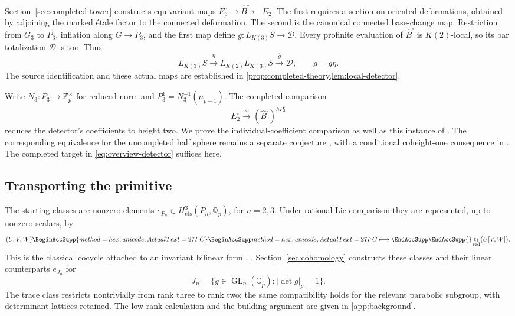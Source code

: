 \documentclass[11pt]{article}
\numberwithin{equation}{section}
\theoremstyle{definition}
\theoremstyle{remark}
\newcommand{\Q}{\mathbb Q}
\newcommand{\Z}{\mathbb Z}
\newcommand{\cts}{\mathrm{cts}}
\DeclareMathOperator{\GL}{GL}
\DeclareMathOperator{\tr}{tr}
\let\UnicodeOriginalLongmapsto\longmapsto
\DeclareRobustCommand{\longmapsto}{
  \BeginAccSupp{method=hex,unicode,ActualText=27FC}
  \UnicodeOriginalLongmapsto\EndAccSupp{}}
\begin{document}
Section~\ref{sec:completed-tower} constructs equivariant maps
\(E_3^\square\to\widehat B^\square\leftarrow E_2^\square\).
The first requires a section on oriented deformations, obtained by
adjoining the marked \'etale factor to the connected deformation.
The second is the canonical connected base-change map. Restriction
from \(G_3\) to \(P_3\), inflation along \(G\to P_3\), and the first
map define \(g:L_{K(3)}S\to\mathcal D\). Every profinite evaluation
of \(\widehat B^\square\) is \(K(2)\)-local, so its bar totalization
\(\mathcal D\) is too. Thus
\begin{equation}\label{eq:overview-detector}
 L_{K(3)}S\xrightarrow{\eta}L_{K(2)}L_{K(3)}S
       \xrightarrow{\overline g}\mathcal D,
 \qquad g=\overline g\eta.
\end{equation}
The source identification and these actual maps are established in
\cref{prop:completed-theory,lem:local-detector}.

Write \(N_3:P_3\to\Z_p^\times\) for reduced norm and
\(P_3^1=N_3^{-1}(\mu_{p-1})\). The completed comparison
\[
 E_2^\square\xrightarrow{\sim}(\widehat B^\square)^{hP_3^1}
\]
reduces the detector's coefficients to height two. We prove the
individual-coefficient comparison as well as this instance of
\cite[Theorem~5.2.6]{BMR2026}. The corresponding equivalence for the
uncompleted half sphere remains a separate conjecture
\cite[Conjectures~1.1.1 and~5.1.13]{BMR2026}, with a conditional
coheight-one consequence in \cite[Proposition~5.1.17]{BMR2026}.
The completed target in \eqref{eq:overview-detector} suffices here.

\subsection{Transporting the primitive}

The starting classes are nonzero elements
\(e_{P_n}\in H^3_{\cts}(P_n,\Q_p)\), for \(n=2,3\).
Under rational Lie comparison they are represented, up to nonzero
scalars, by
\[
 (U,V,W)\longmapsto\tr_{\mathrm{red}}\bigl(U[V,W]\bigr).
\]
This is the classical cocycle attached to an invariant bilinear form
\cite[\S21]{ChevalleyEilenberg1948}, \cite[\S11]{Koszul1950}.
Section~\ref{sec:cohomology} constructs these classes and their linear
counterparts \(e_{J_n}\) for
\[
 J_n=\{g\in\GL_n(\Q_p):|\det g|_p=1\}.
\]
The trace class restricts nontrivially from rank three to rank two;
the same compatibility holds for the relevant parabolic subgroup,
with determinant lattices retained. The low-rank calculation and the building argument are given
in \cref{app:background}.
\end{document}
